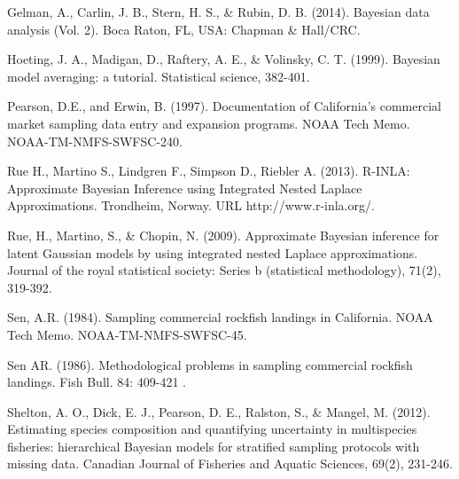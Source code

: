 \documentclass[12pt]{article}
\begin{document}
%
\begin{thebibliography}{1}

%
 Gelman, A., Carlin, J. B., Stern, H. S., \& Rubin, D. B. (2014). Bayesian data analysis (Vol. 2). Boca Raton, FL, USA: Chapman \& Hall/CRC.

%
 Hoeting, J. A., Madigan, D., Raftery, A. E., \& Volinsky, C. T. (1999). Bayesian model averaging: a tutorial. Statistical science, 382-401.

%
 Pearson, D.E., and Erwin, B. (1997). Documentation of California’s commercial market sampling data entry and expansion programs. NOAA Tech Memo. NOAA-TM-NMFS-SWFSC-240.

%
 Rue H., Martino S., Lindgren F., Simpson D., Riebler A. (2013). R-INLA:
Approximate Bayesian Inference using Integrated Nested Laplace
Approximations. Trondheim, Norway. URL http://www.r-inla.org/.

%
 Rue, H., Martino, S., \& Chopin, N. (2009). Approximate Bayesian
inference for latent Gaussian models by using integrated nested Laplace
approximations. Journal of the royal statistical society: Series b
(statistical methodology), 71(2), 319-392.

%
 Sen, A.R. (1984). Sampling commercial rockfish landings in California. NOAA Tech Memo. NOAA-TM-NMFS-SWFSC-45. 

%
 Sen AR. (1986). Methodological problems in sampling commercial rockfish landings. Fish Bull. 84: 409-421 .

%
 Shelton, A. O., Dick, E. J., Pearson, D. E., Ralston, S., \& Mangel, M. (2012). Estimating species composition and quantifying uncertainty in multispecies fisheries: hierarchical Bayesian models for stratified sampling protocols with missing data. Canadian Journal of Fisheries and Aquatic Sciences, 69(2), 231-246.
\end{thebibliography}
\end{document}
